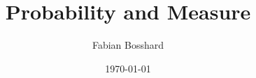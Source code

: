\newcommand{\id}{\operatorname{id}}


\newcommand*{\matrspace}{0.8mu}
\newcommand{\matr}[1]{\mspace{\matrspace}\underline{\mspace{-\matrspace}\smash[b]{\boldsymbol{#1}}\mspace{-\matrspace}}\mspace{\matrspace}}
\newcommand{\vect}[1]{{\boldsymbol{#1}}}

\newcommand{\dif}{\mathrm{d}}
\newcommand{\eu}{e}
\newcommand{\iu}{\imath}
\newcommand{\sign}{\operatorname{sgn}}

\newcommand{\oo}{\infty}


\newcommand\symdif{\mathrel{\triangle}}

\newcommand{\ind}{\mathbf{1}}


\newcommand{\R}{\mathbb{R}}
\newcommand{\N}{\mathbb{N}}
\newcommand{\Z}{\mathbb{Z}}
\newcommand{\Q}{\mathbb{Q}}
\newcommand{\C}{\mathbb{C}}
\newcommand{\K}{\mathbb{K}}
\newcommand{\F}{\mathbb{F}}

\newcommand{\Var}{\operatorname{\mathbb{V}ar}}
\newcommand{\Cov}{\operatorname{\mathbb{C}ov}}
\newcommand{\Exp}{\operatorname{\mathbb{E}}}
\newcommand{\Prob}{\mathbb{P}}
\newcommand{\numof}{\ensuremath{\#\,}}
\newcommand{\blackheight}{\operatorname{bh}}

\newcommand{\attrib}[2]{\ensuremath{#1\mathtt{.}\mathtt{#2}}}
\newcommand{\attribnormal}[2]{\ensuremath{#1\mathtt{.}#2}}

\title{Probability and Measure}
\author{Fabian Bosshard}
\date{\today}

\usepackage[
  linktoc=none,
  pdfauthor={Fabian Bosshard},
  pdftitle={USI - Probability and Measure - Course Notes},
  pdfkeywords={USI, probability, measure theory, course notes, informatics},
  colorlinks=false,
  pdfborder={0 0 0},
  linkbordercolor={0 0.6 1},
  urlbordercolor={0 0.6 1},
  citebordercolor={0 0.6 1}
]{hyperref}
\usepackage{xurl} 


